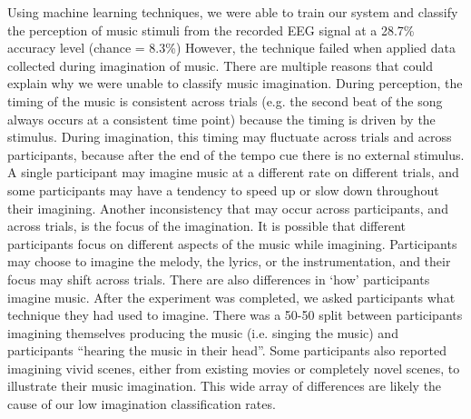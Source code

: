 Using machine learning techniques, we were able to train our system and classify the perception of music stimuli from the recorded EEG signal at a 28.7\% accuracy level (chance = 8.3\%)
However, the technique failed when applied data collected during imagination of music.
There are multiple reasons that could explain why we were unable to classify music imagination.
During perception, the timing of the music is consistent across trials (e.g. the second beat of the song always occurs at a consistent time point) because the timing is driven by the stimulus. 
During imagination, this timing may fluctuate across trials and across participants, because after the end of the tempo cue there is no external stimulus.
A single participant may imagine music at a different rate on different trials, and some participants may have a tendency to speed up or slow down throughout their imagining. 
Another inconsistency that may occur across participants, and across trials, is the focus of the imagination. 
It is possible that different participants focus on different aspects of the music while imagining.
Participants may choose to imagine the melody, the lyrics, or the instrumentation, and their focus may shift across trials.
There are also differences in `how' participants imagine music. 
After the experiment was completed, we asked participants what technique they had used to imagine. 
There was a 50-50 split between participants imagining themselves producing the music (i.e. singing the music) and participants ``hearing the music in their head''. 
Some participants also reported imagining vivid scenes, either from existing movies or completely novel scenes, to illustrate their music imagination.
This wide array of differences are likely the cause of our low imagination classification rates. 

